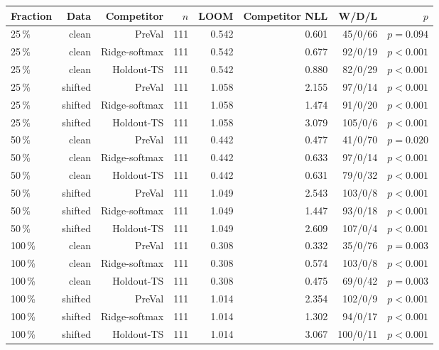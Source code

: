 \begin{tabular}{lrrrrrrr}
\toprule
Fraction & Data & Competitor & $n$ & LOOM & Competitor NLL & W/D/L & $p$ \\
\midrule
25\,\% & clean & PreVal & 111 & 0.542 & 0.601 & 45/0/66 & $p=0.094$ \\
25\,\% & clean & Ridge-softmax & 111 & 0.542 & 0.677 & 92/0/19 & $p<0.001$ \\
25\,\% & clean & Holdout-TS & 111 & 0.542 & 0.880 & 82/0/29 & $p<0.001$ \\
25\,\% & shifted & PreVal & 111 & 1.058 & 2.155 & 97/0/14 & $p<0.001$ \\
25\,\% & shifted & Ridge-softmax & 111 & 1.058 & 1.474 & 91/0/20 & $p<0.001$ \\
25\,\% & shifted & Holdout-TS & 111 & 1.058 & 3.079 & 105/0/6 & $p<0.001$ \\
50\,\% & clean & PreVal & 111 & 0.442 & 0.477 & 41/0/70 & $p=0.020$ \\
50\,\% & clean & Ridge-softmax & 111 & 0.442 & 0.633 & 97/0/14 & $p<0.001$ \\
50\,\% & clean & Holdout-TS & 111 & 0.442 & 0.631 & 79/0/32 & $p<0.001$ \\
50\,\% & shifted & PreVal & 111 & 1.049 & 2.543 & 103/0/8 & $p<0.001$ \\
50\,\% & shifted & Ridge-softmax & 111 & 1.049 & 1.447 & 93/0/18 & $p<0.001$ \\
50\,\% & shifted & Holdout-TS & 111 & 1.049 & 2.609 & 107/0/4 & $p<0.001$ \\
100\,\% & clean & PreVal & 111 & 0.308 & 0.332 & 35/0/76 & $p=0.003$ \\
100\,\% & clean & Ridge-softmax & 111 & 0.308 & 0.574 & 103/0/8 & $p<0.001$ \\
100\,\% & clean & Holdout-TS & 111 & 0.308 & 0.475 & 69/0/42 & $p=0.003$ \\
100\,\% & shifted & PreVal & 111 & 1.014 & 2.354 & 102/0/9 & $p<0.001$ \\
100\,\% & shifted & Ridge-softmax & 111 & 1.014 & 1.302 & 94/0/17 & $p<0.001$ \\
100\,\% & shifted & Holdout-TS & 111 & 1.014 & 3.067 & 100/0/11 & $p<0.001$ \\
\bottomrule
\end{tabular}
